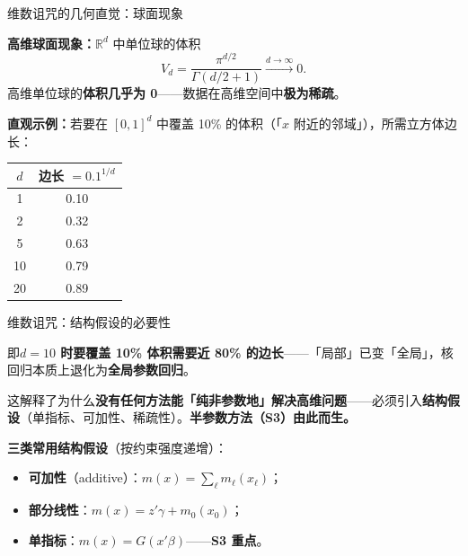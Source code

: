 \documentclass[aspectratio=169, 10pt]{beamer}
\begin{document}
\begin{frame}{维数诅咒的几何直觉：球面现象}

  \begin{keybox}
    \textbf{高维球面现象：}$\mathbb{R}^d$ 中单位球的体积
    \[
      V_d = \frac{\pi^{d/2}}{\Gamma(d/2+1)}
      \xrightarrow{d\to\infty} 0.
    \]
    高维单位球的\textbf{体积几乎为 0}——数据在高维空间中\textbf{极为稀疏}。
  \end{keybox}

  \textbf{直观示例：}若要在 $[0,1]^d$ 中覆盖 10\% 的体积（「$x$ 附近的邻域」），所需立方体边长：
  \small
  \begin{center}
  \begin{tabular}{@{}c|c@{}}
    \toprule
    $d$ & 边长 $= 0.1^{1/d}$ \\
    \midrule
    1 & 0.10 \\
    2 & 0.32 \\
    5 & 0.63 \\
    10 & 0.79 \\
    20 & 0.89 \\
    \bottomrule
  \end{tabular}
  \end{center}
  \normalsize

\end{frame}


\begin{frame}{维数诅咒：结构假设的必要性}

  即\textbf{$d=10$ 时要覆盖 10\% 体积需要近 80\% 的边长}——「局部」已变「全局」，核回归本质上退化为\textbf{全局参数回归}。

  \begin{highlightbox}
    这解释了为什么\textbf{没有任何方法能「纯非参数地」解决高维问题}——必须引入\textbf{结构假设}（单指标、可加性、稀疏性）。\textbf{半参数方法（S3）由此而生。}
  \end{highlightbox}

  \begin{keybox}
    \textbf{三类常用结构假设}（按约束强度递增）：
    \begin{itemize}
      \item \textbf{可加性}（additive）：$m(x) = \sum_\ell m_\ell(x_\ell)$；
      \item \textbf{部分线性}：$m(x) = z'\gamma + m_0(x_0)$；
      \item \textbf{单指标}：$m(x) = G(x'\beta)$——\textbf{S3 重点}。
    \end{itemize}
  \end{keybox}

\end{frame}
\end{document}
